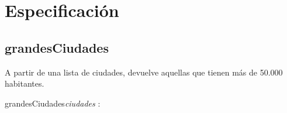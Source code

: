 \documentclass[10pt,a4paper]{article}
\begin{document}

\maketitle

\section{Especificación}

\subsection{grandesCiudades}

A partir de una lista de ciudades, devuelve aquellas que tienen más de 50.000 habitantes.

\vspace{2mm}  %
 


\begin{proc}{grandesCiudades}{\In \textit{ciudades} : }{}
\end{proc}





\vspace{2mm}




\vspace{4mm}
\end{document}
